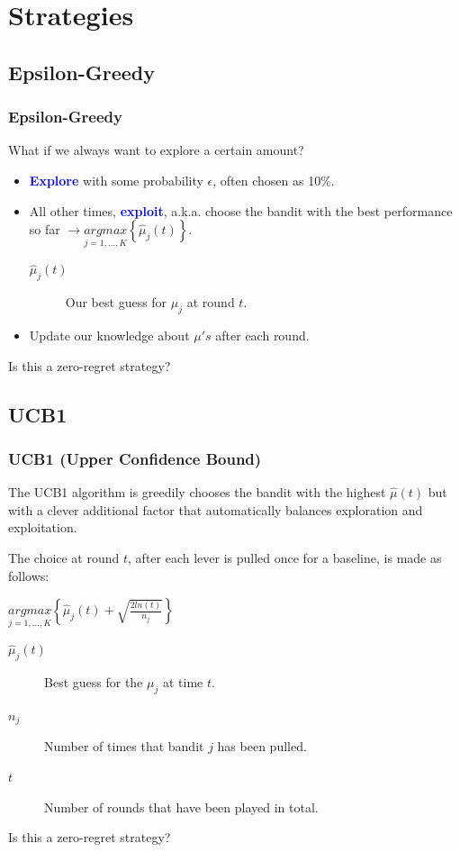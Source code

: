 \documentclass{beamer}
\begin{document}
\section{Strategies}
\subsection{Epsilon-Greedy}
\begin{frame}
  \frametitle{Epsilon-Greedy}
  What if we always want to explore a certain amount? \vspace{4mm}
  \pause
  \begin{itemize}
    \item \textbf{\textcolor{blue}{Explore}} with some probability $\epsilon$, often chosen as 10\%.
    \item All other times, \textbf{\textcolor{blue}{exploit}}, a.k.a. choose the bandit with the best performance so far $\rightarrow \underset{j=1,...,K}{argmax}\left \{\hat{\mu}_j(t) \right \}$.
    \begin{description} 
      \item[$\hat{\mu}_j(t)$] Our best guess for $\mu_j$ at round $t$.
    \end{description}
    \item Update our knowledge about $\mu's$ after each round.
  \end{itemize} \vspace{3mm} \pause

  Is this a zero-regret strategy?
\end{frame}

\subsection{UCB1}
\begin{frame}
  \frametitle{UCB1 (Upper Confidence Bound)}
  The UCB1 algorithm is greedily chooses the bandit with the highest $\hat{\mu}(t)$ but with a clever additional factor that automatically balances exploration and exploitation. \vspace{2mm} \pause 
  
  The choice at round $t$, after each lever is pulled once for a baseline, is made as follows: \vspace{2mm}

  \begin{center}
    $\underset{j=1,...,K}{argmax}\left \{\hat{\mu}_j(t) + \sqrt{\frac{2ln(t)}{n_j}} \right \}$
  \end{center}

  \begin{description}
    \item[$\hat{\mu}_j(t)$] Best guess for the $\mu_j$ at time $t$.
    \item[$n_j$] Number of times that bandit $j$ has been pulled.
    \item[$t$] Number of rounds that have been played in total.
  \end{description}

  Is this a zero-regret strategy?
\end{frame}
\end{document}

